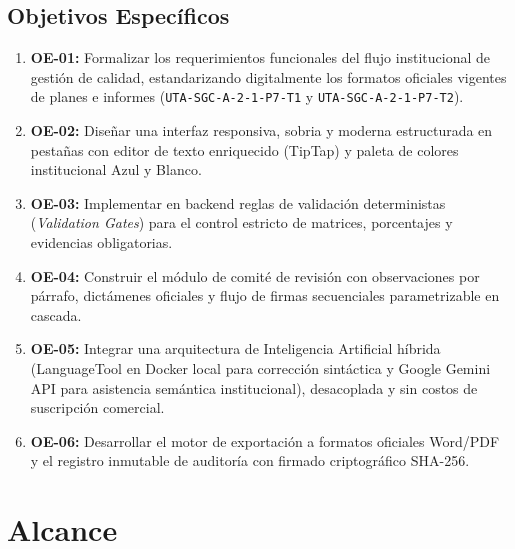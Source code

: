 \documentclass[12pt,a4paper]{article}
\begin{document}
\subsection{Objetivos Específicos}
\begin{enumerate}[leftmargin=1.5em, itemsep=2pt, topsep=2pt]
    \item \textbf{OE-01:} Formalizar los requerimientos funcionales del flujo institucional de gestión de calidad, estandarizando digitalmente los formatos oficiales vigentes de planes e informes (\texttt{UTA-SGC-A-2-1-P7-T1} y \texttt{UTA-SGC-A-2-1-P7-T2}).
    \item \textbf{OE-02:} Diseñar una interfaz responsiva, sobria y moderna estructurada en pestañas con editor de texto enriquecido (TipTap) y paleta de colores institucional Azul y Blanco.
    \item \textbf{OE-03:} Implementar en backend reglas de validación deterministas (\textit{Validation Gates}) para el control estricto de matrices, porcentajes y evidencias obligatorias.
    \item \textbf{OE-04:} Construir el módulo de comité de revisión con observaciones por párrafo, dictámenes oficiales y flujo de firmas secuenciales parametrizable en cascada.
    \item \textbf{OE-05:} Integrar una arquitectura de Inteligencia Artificial híbrida (LanguageTool en Docker local para corrección sintáctica y Google Gemini API para asistencia semántica institucional), desacoplada y sin costos de suscripción comercial.
    \item \textbf{OE-06:} Desarrollar el motor de exportación a formatos oficiales Word/PDF y el registro inmutable de auditoría con firmado criptográfico SHA-256.
\end{enumerate}

\section{Alcance}
\end{document}
